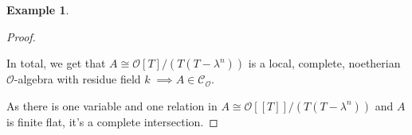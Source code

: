\documentclass{article}
\theoremstyle{plain}%
\theoremstyle{definition}
\newtheorem{example}[theorem]{Example}
\theoremstyle{remark}
\newcommand{\co}{\mathcal{C}_\mathcal{O}}
\begin{document}
\begin{example}
\begin{proof}
\begin{itemize}
                In total, we get that \(A \cong \mathcal{O}[T]/(T(T-\lambda^n))\) is a local, complete, 
                noetherian \(\mathcal{O}\)-algebra with residue field \(k\; \implies A \in \co\).     
        \end{itemize}
        As there is one variable and one relation in \(A \cong \mathcal{O}[[T]]/(T(T-\lambda^n))\) and
        \(A\) is finite flat, it's a complete intersection.
    \end{proof}
\end{example}

\end{document}
